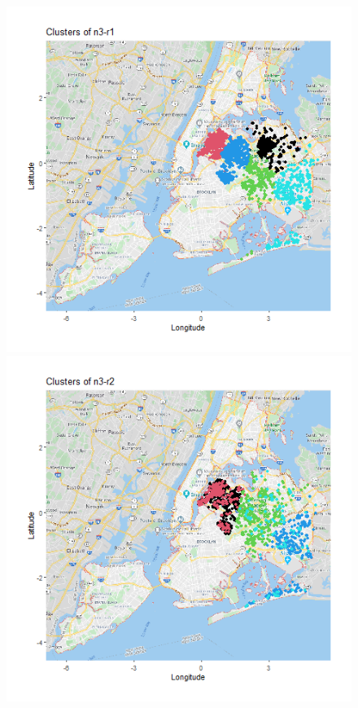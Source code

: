 \documentclass{FR16}
\begin{document}
\begin{figure}[!htb]
\begin{minipage}{0.33\textwidth}
   \end{minipage}\hfill
\begin{minipage}{0.33\textwidth}
     \centering
     \includegraphics[width=1\linewidth]{figures/clust-n3-r1.png} 
   \end{minipage}\hfill
   \begin{minipage}{0.33\textwidth}
     \centering
     \includegraphics[width=1\linewidth]{figures/clust-n3-r2.png}

\end{minipage}
\end{figure}
\end{document}
